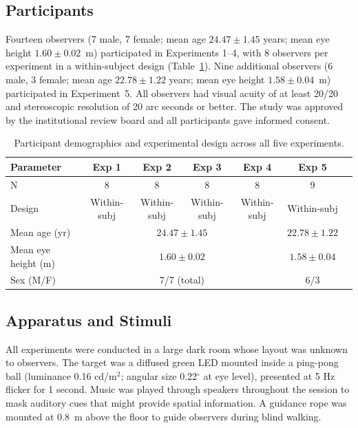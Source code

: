 \documentclass[12pt]{article}
\begin{document}
\subsection{Participants}

Fourteen observers (7 male, 7 female; mean age $24.47 \pm 1.45$ years; mean eye height $1.60 \pm 0.02$~m) participated in Experiments 1--4, with 8 observers per experiment in a within-subject design (Table~\ref{tab:participants}). Nine additional observers (6 male, 3 female; mean age $22.78 \pm 1.22$ years; mean eye height $1.58 \pm 0.04$~m) participated in Experiment~5. All observers had visual acuity of at least 20/20 and stereoscopic resolution of 20 arc seconds or better. The study was approved by the institutional review board and all participants gave informed consent.

\begin{table}[ht]
\centering
\caption{Participant demographics and experimental design across all five experiments.}
\label{tab:participants}
\begin{tabular}{lcccccc}
\toprule
\textbf{Parameter} & \textbf{Exp 1} & \textbf{Exp 2} & \textbf{Exp 3} & \textbf{Exp 4} & \textbf{Exp 5} \\
\midrule
N & 8 & 8 & 8 & 8 & 9 \\
Design & Within-subj & Within-subj & Within-subj & Within-subj & Within-subj \\
Mean age (yr) & \multicolumn{4}{c}{$24.47 \pm 1.45$} & $22.78 \pm 1.22$ \\
Mean eye height (m) & \multicolumn{4}{c}{$1.60 \pm 0.02$} & $1.58 \pm 0.04$ \\
Sex (M/F) & \multicolumn{4}{c}{7/7 (total)} & 6/3 \\
\bottomrule
\end{tabular}
\end{table}

\subsection{Apparatus and Stimuli}

All experiments were conducted in a large dark room whose layout was unknown to observers. The target was a diffused green LED mounted inside a ping-pong ball (luminance 0.16 cd/m$^2$; angular size 0.22$^\circ$ at eye level), presented at 5 Hz flicker for 1 second. Music was played through speakers throughout the session to mask auditory cues that might provide spatial information. A guidance rope was mounted at 0.8~m above the floor to guide observers during blind walking.
\end{document}
